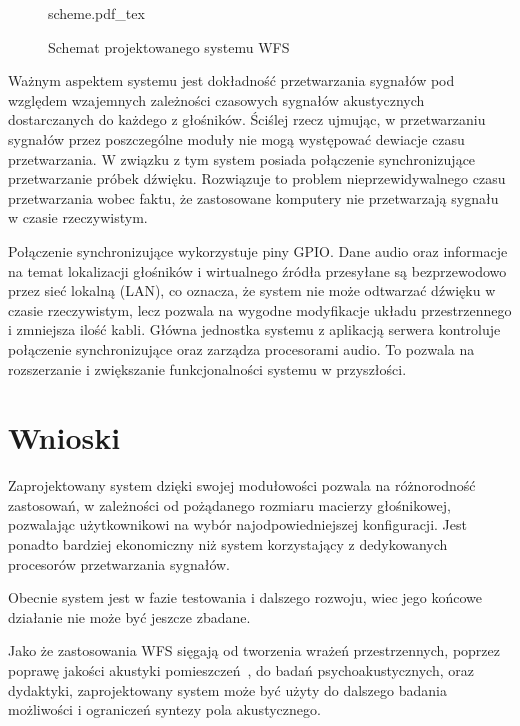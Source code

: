 \documentclass[12pt]{oska}
\let\Oldsection\section
\renewcommand{\section}{\FloatBarrier\Oldsection}
\begin{document}
\begin{figure}[!tbh]
  \centering
  {scheme.pdf_tex}
  \caption{Schemat projektowanego systemu WFS}
  \label{fig:schemat}
\end{figure}

Ważnym aspektem systemu jest dokładność przetwarzania sygnałów pod względem wzajemnych 
zależności czasowych sygnałów akustycznych dostarczanych do każdego z głośników. 
Ściślej rzecz ujmując, w przetwarzaniu sygnałów przez poszczególne moduły nie mogą 
występować dewiacje czasu przetwarzania. W związku z tym system posiada
połączenie synchronizujące przetwarzanie próbek dźwięku.
Rozwiązuje to problem nieprzewidywalnego czasu przetwarzania wobec faktu,
że zastosowane komputery nie przetwarzają sygnału w czasie rzeczywistym.

Połączenie synchronizujące wykorzystuje piny GPIO. Dane audio oraz informacje
na temat lokalizacji głośników i wirtualnego źródła przesyłane są bezprzewodowo 
przez sieć lokalną (LAN), co oznacza, że system nie może odtwarzać dźwięku w czasie 
rzeczywistym, lecz pozwala na wygodne modyfikacje układu przestrzennego i zmniejsza ilość kabli. Główna
jednostka systemu z aplikacją serwera kontroluje połączenie synchronizujące
oraz zarządza procesorami audio. To pozwala na rozszerzanie i zwiększanie
funkcjonalności systemu w przyszłości.

\section{Wnioski}

Zaprojektowany system dzięki swojej modułowości pozwala na różnorodność
zastosowań, w zależności od pożądanego rozmiaru macierzy głośnikowej,
pozwalając użytkownikowi na wybór najodpowiedniejszej konfiguracji. Jest
ponadto bardziej ekonomiczny niż system korzystający z dedykowanych procesorów
przetwarzania sygnałów.

Obecnie system jest w fazie testowania i dalszego rozwoju, wiec jego końcowe
działanie nie może być jeszcze zbadane.

Jako że zastosowania WFS sięgają od tworzenia wrażeń przestrzennych, poprzez
poprawę jakości akustyki pomieszczeń~\cite{enhancement}, do badań
psychoakustycznych, oraz dydaktyki, zaprojektowany system może być użyty
do dalszego badania możliwości i ograniczeń syntezy pola akustycznego.

\printbibliography
\end{document}
